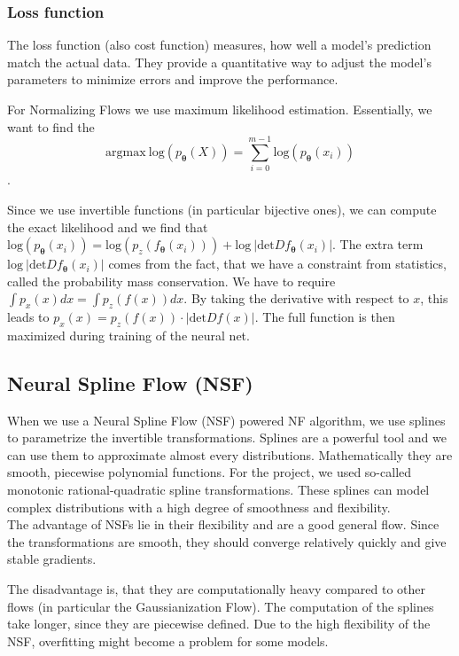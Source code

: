 \documentclass[
nofootinbib,
 amsmath,amssymb,
 aps,
]{revtex4-2}
\begin{document}
\subsubsection{Loss function}
The loss function (also cost function) measures, how well a model's prediction match the actual data. They provide a quantitative way to adjust the model's parameters to minimize errors and improve the performance.

For Normalizing Flows we use maximum likelihood estimation. Essentially, we want to find the
\begin{equation}
    \mathrm{argmax}\ \mathrm{log}(p_{\boldsymbol{\theta}}(X)) = \sum_{i=0}^{m-1} \mathrm{log}(p_{\boldsymbol{\theta}}(x_i))
\label{eqn:loss}
\end{equation}.

Since we use invertible functions (in particular bijective ones), we can compute the exact likelihood and we find that $\mathrm{log}(p_{\boldsymbol{\theta}}(x_i)) = \mathrm{log}(p_{z}(f_{\boldsymbol{\theta}}(x_i))) + \mathrm{log}\ |\mathrm{det}D f_{\boldsymbol{\theta}}(x_i)|$. The extra term $\mathrm{log}\ |\mathrm{det}D f_{\boldsymbol{\theta}}(x_i)|$ comes from the fact, that we have a constraint from statistics, called the probability mass conservation. We have to require $\int p_x(x) dx = \int p_{z}(f(x)) dx$. By taking the derivative with respect to $x$, this leads to $p_x(x) = p_{z}(f(x)) \cdot |\mathrm{det}D f(x)|$. The full function is then maximized during training of the neural net.

\subsection{Neural Spline Flow (NSF)}

When we use a Neural Spline Flow (NSF) powered NF algorithm, we use splines to parametrize the invertible transformations. Splines are a powerful tool and we can use them to approximate almost every distributions. Mathematically they are smooth, piecewise polynomial functions. For the project, we used so-called monotonic rational-quadratic spline transformations. These splines can model complex distributions with a high degree of smoothness and flexibility. \\

The advantage of NSFs lie in their flexibility and are a good general flow. Since the transformations are smooth, they should converge relatively quickly and give stable gradients.

The disadvantage is, that they are computationally heavy compared to other flows (in particular the Gaussianization Flow). The computation of the splines take longer, since they are piecewise defined. Due to the high flexibility of the NSF, overfitting might become a problem for some models.
\end{document}
